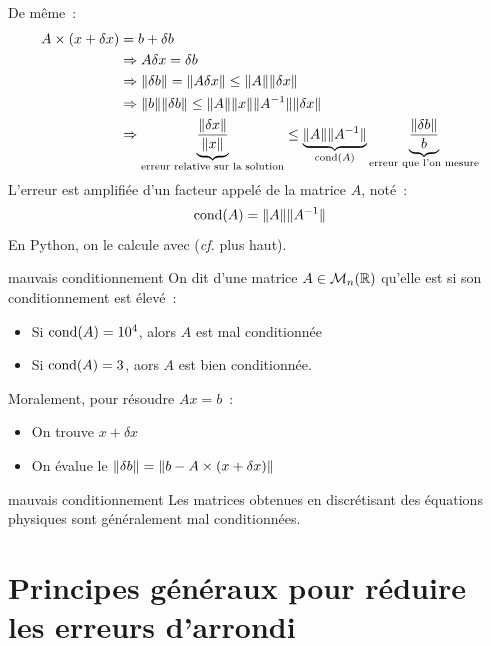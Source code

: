 De même~:
\begin{align*}
    A \times (x + \delta x) &= b + \delta b \\
    &\Rightarrow A \delta x = \delta b\\
    &\Rightarrow \lVert\delta b\rVert = \lVert A \delta x\rVert \leq \lVert A\rVert\lVert\delta x\rVert\\
    &\Rightarrow \lVert b\rVert \lVert\delta b\rVert \leq \lVert A\rVert\lVert x\rVert \lVert A^{-1}\rVert\lVert\delta x\rVert\\
    &\Rightarrow \underbrace{\frac{\lVert\delta x\rVert}{\lVert x\rVert}}_{\text{erreur relative sur la solution}} \leq \underbrace{\lVert A\rVert\lVert A^{-1}\rVert}_{\mathrm{cond}(A)} \underbrace{\frac{\lVert\delta b\rVert}{b}}_\text{erreur que l'on mesure}\\
\end{align*}
L'erreur est amplifiée d'un facteur appelé  de la matrice $A$, noté~:
$$\mathrm{cond}(A) = \lVert A\rVert\lVert A^{-1}\rVert$$
En Python, on le calcule avec  (\textit{cf.} plus haut).

\begin{definition}{}{mauvais conditionnement}
    On dit d'une matrice $A \in \mathcal{M}_{n}(\mathbb{R})$ qu'elle est  si son conditionnement est élevé~:
    \begin{itemize}
        \item Si $\mathrm{cond}(A) = 10^4$, alors $A$ est mal conditionnée
        \item Si $\mathrm{cond}(A) = 3$, aors $A$ est bien conditionnée.
    \end{itemize}
\end{definition}

Moralement, pour résoudre $Ax = b$~:
\begin{itemize}
    \item On trouve $x + \delta x$
    \item On évalue le  $\lVert\delta b\rVert = \lVert b - A\times(x + \delta x)\rVert$
\end{itemize}

\begin{remarque}{}{mauvais conditionnement}
    Les matrices obtenues en discrétisant des équations physiques sont généralement mal conditionnées.
\end{remarque}

\section{Principes généraux pour réduire les erreurs d'arrondi}

